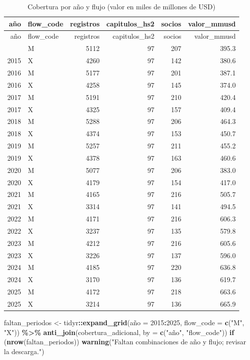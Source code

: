 \documentclass[
]{article}
\newenvironment{Shaded}{\begin{snugshade}}{\end{snugshade}}
\newcommand{\AttributeTok}[1]{\textcolor[rgb]{0.13,0.29,0.53}{#1}}
\newcommand{\ControlFlowTok}[1]{\textcolor[rgb]{0.13,0.29,0.53}{\textbf{#1}}}
\newcommand{\DecValTok}[1]{\textcolor[rgb]{0.00,0.00,0.81}{#1}}
\newcommand{\FunctionTok}[1]{\textcolor[rgb]{0.13,0.29,0.53}{\textbf{#1}}}
\newcommand{\NormalTok}[1]{#1}
\newcommand{\OtherTok}[1]{\textcolor[rgb]{0.56,0.35,0.01}{#1}}
\newcommand{\SpecialCharTok}[1]{\textcolor[rgb]{0.81,0.36,0.00}{\textbf{#1}}}
\newcommand{\StringTok}[1]{\textcolor[rgb]{0.31,0.60,0.02}{#1}}
\begin{document}
\begin{longtable}[]{@{}rlrrrr@{}}
\caption{Cobertura por año y flujo (valor en miles de millones de
USD)}\tabularnewline
\toprule\noalign{}
año & flow\_code & registros & capitulos\_hs2 & socios & valor\_mmusd \\
\midrule\noalign{}
\endfirsthead
\toprule\noalign{}
año & flow\_code & registros & capitulos\_hs2 & socios & valor\_mmusd \\
\midrule\noalign{}
\endhead
\bottomrule\noalign{}
\endlastfoot
2015 & M & 5112 & 97 & 207 & 395.3 \\
2015 & X & 4260 & 97 & 142 & 380.6 \\
2016 & M & 5177 & 97 & 201 & 387.1 \\
2016 & X & 4258 & 97 & 145 & 374.0 \\
2017 & M & 5191 & 97 & 210 & 420.4 \\
2017 & X & 4325 & 97 & 157 & 409.4 \\
2018 & M & 5288 & 97 & 206 & 464.3 \\
2018 & X & 4374 & 97 & 153 & 450.7 \\
2019 & M & 5257 & 97 & 211 & 455.2 \\
2019 & X & 4378 & 97 & 163 & 460.6 \\
2020 & M & 5077 & 97 & 206 & 383.0 \\
2020 & X & 4179 & 97 & 154 & 417.0 \\
2021 & M & 4165 & 97 & 216 & 505.7 \\
2021 & X & 3314 & 97 & 141 & 494.5 \\
2022 & M & 4171 & 97 & 216 & 606.3 \\
2022 & X & 3237 & 97 & 135 & 579.8 \\
2023 & M & 4212 & 97 & 216 & 605.6 \\
2023 & X & 3226 & 97 & 137 & 596.0 \\
2024 & M & 4185 & 97 & 220 & 636.8 \\
2024 & X & 3170 & 97 & 136 & 619.7 \\
2025 & M & 4172 & 97 & 218 & 663.6 \\
2025 & X & 3214 & 97 & 136 & 665.9 \\
\end{longtable}

\begin{Shaded}
\begin{Highlighting}[]
\NormalTok{faltan\_periodos }\OtherTok{\textless{}{-}}\NormalTok{ tidyr}\SpecialCharTok{::}\FunctionTok{expand\_grid}\NormalTok{(año }\OtherTok{=} \DecValTok{2015}\SpecialCharTok{:}\DecValTok{2025}\NormalTok{,}
                                     \AttributeTok{flow\_code =} \FunctionTok{c}\NormalTok{(}\StringTok{"M"}\NormalTok{, }\StringTok{"X"}\NormalTok{)) }\SpecialCharTok{\%\textgreater{}\%}
  \FunctionTok{anti\_join}\NormalTok{(cobertura\_adicional, }\AttributeTok{by =} \FunctionTok{c}\NormalTok{(}\StringTok{"año"}\NormalTok{, }\StringTok{"flow\_code"}\NormalTok{))}
\ControlFlowTok{if}\NormalTok{ (}\FunctionTok{nrow}\NormalTok{(faltan\_periodos))}
  \FunctionTok{warning}\NormalTok{(}\StringTok{"Faltan combinaciones de año y flujo; revisar la descarga."}\NormalTok{)}
\end{Highlighting}
\end{Shaded}
\end{document}
